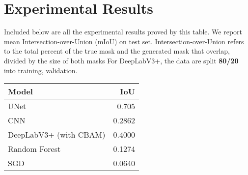 \newpage
\section{Experimental Results}
Included below are all the experimental results proved by this table.
We report mean Intersection-over-Union (mIoU) on test set.
Intersection-over-Union refers to the total percent of the true mask and the generated mask that overlap, divided by the size of both masks
For DeepLabV3+, the data are split \textbf{80/20} into training, validation.
\begin{table}[h]
  \centering
  \begin{large} 
  \begin{tabular}{|l|r|}
    \hline
    \textbf{Model} & \textbf{IoU} \\ \hline
    UNet           & 0.705  \\ \hline
    CNN            & 0.2862 \\ \hline
    DeepLabV3+ (with CBAM) & 0.4000 \\ \hline
    Random Forest  & 0.1274 \\ \hline
    SGD            & 0.0640 \\ \hline
  \end{tabular}
  \end{large}
\end{table}
